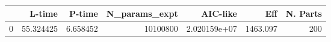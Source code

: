 \begin{tabular}{lrrrrrr}
\toprule
{} &     L-time &    P-time &  N\_params\_expt &      AIC-like &       Eff &  N. Parts \\
\midrule
0 &  55.324425 &  6.658452 &       10100800 &  2.020159e+07 &  1463.097 &       200 \\
\bottomrule
\end{tabular}
